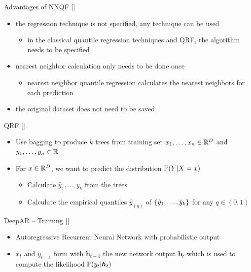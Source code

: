 \documentclass[10pt,aspectratio=169]{beamer}
\begin{document}
\begin{frame}{Advantages of NNQF [\cite{Ordiano2020}]}
    \begin{itemize}
        \item the regression technique is not specified, any technique can be used
        \begin{itemize}
            \item in the classical quantile regression techniques and QRF, the algorithm needs to be specified
        \end{itemize}
        \item nearest neighbor calculation only needs to be done once
        \begin{itemize}
            \item nearest neighbor quantile regression calculates the nearest neighbors for each prediction
        \end{itemize}
        \item the original dataset does not need to be saved
    \end{itemize}
\end{frame}

\begin{frame}{QRF [\cite{Meinshausen2006}]}
    \begin{itemize}
        \item Use bagging to produce \(k\) trees from training set \(x_1, \ldots, x_n \in \R^D\) and \(y_1, \ldots, y_n \in \R\)
        \item For \(x\in \R^D\), we want to predict the distribution \(\P(Y | X=x)\)
        \begin{itemize}
            \item Calculate \(\hat{y}_1, \ldots, \hat{y}_k\) from the trees 
            \item Calculate the empirical quantiles \(\hat{y}_{(q)}\) of \(\set{\hat{y}_1, \ldots, \hat{y}_k}\) for any \(q \in (0,1)\)
        \end{itemize}
    \end{itemize}
\end{frame}

\begin{frame}[fragile]{DeepAR -- Training [\cite{Salinas2020}]}
    \begin{center}
        
    \end{center}
    \begin{itemize}
        \item Autoregressive Recurrent Neural Network with probabilistic output
        \item \(x_t\) and \(y_{t-1}\) form with \(\boldsymbol{h}_{t-1}\) the new network output \(\boldsymbol{h}_t\)
        which is used to compute the likelihood \(\P(y_t | \boldsymbol{h}_t)\)
    \end{itemize}
\end{frame}
\end{document}
